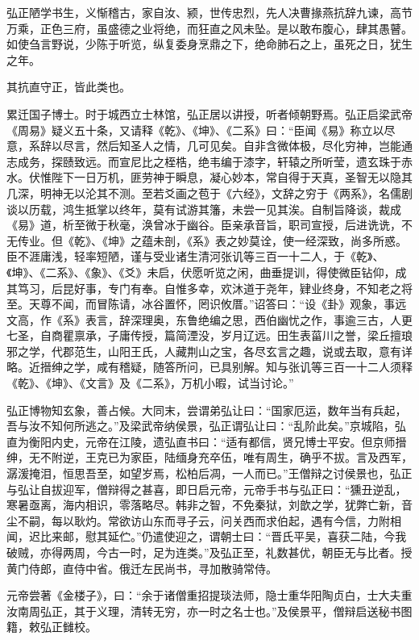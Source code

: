 \documentclass[]{article}
\begin{document}
弘正陋学书生，义惭稽古，家自汝、颍，世传忠烈，先人决曹掾燕抗辞九谏，高节万乘，正色三府，虽盛德之业将绝，而狂直之风未坠。是以敢布腹心，肆其愚瞽。如使刍言野说，少陈于听览，纵复委身烹鼎之下，绝命肺石之上，虽死之日，犹生之年。

其抗直守正，皆此类也。

累迁国子博士。时于城西立士林馆，弘正居以讲授，听者倾朝野焉。弘正启梁武帝《周易》疑义五十条，又请释《乾》、《坤》、《二系》曰：``臣闻《易》称立以尽意，系辞以尽言，然后知圣人之情，几可见矣。自非含微体极，尽化穷神，岂能通志成务，探赜致远。而宣尼比之桎梏，绝韦编于漆字，轩辕之所听莹，遗玄珠于赤水。伏惟陛下一日万机，匪劳神于瞬息，凝心妙本，常自得于天真，圣智无以隐其几深，明神无以沦其不测。至若爻画之苞于《六经》，文辞之穷于《两系》，名儒剧谈以历载，鸿生抵掌以终年，莫有试游其籓，未尝一见其涘。自制旨降谈，裁成《易》道，析至微于秋毫，涣曾冰于幽谷。臣亲承音旨，职司宣授，后进诜诜，不无传业。但《乾》、《坤》之蕴未剖，《系》表之妙莫诠，使一经深致，尚多所惑。臣不涯庸浅，轻率短陋，谨与受业诸生清河张讥等三百一十二人，于《乾》、《坤》、《二系》、《象》、《爻》未启，伏愿听览之闲，曲垂提训，得使微臣钻仰，成其笃习，后昆好事，专门有奉。自惟多幸，欢沐道于尧年，肄业终身，不知老之将至。天尊不闻，而冒陈请，冰谷置怀，罔识攸厝。''诏答曰：``设《卦》观象，事远文高，作《系》表言，辞深理奥，东鲁绝编之思，西伯幽忧之作，事逾三古，人更七圣，自商瞿禀承，子庸传授，篇简湮没，岁月辽远。田生表菑川之誉，梁丘擅琅邪之学，代郡范生，山阳王氏，人藏荆山之宝，各尽玄言之趣，说或去取，意有详略。近搢绅之学，咸有稽疑，随答所问，已具别解。知与张讥等三百一十二人须释《乾》、《坤》、《文言》及《二系》，万机小暇，试当讨论。''

弘正博物知玄象，善占候。大同末，尝谓弟弘让曰：``国家厄运，数年当有兵起，吾与汝不知何所逃之。''及梁武帝纳侯景，弘正谓弘让曰：``乱阶此矣。''京城陷，弘直为衡阳内史，元帝在江陵，遗弘直书曰：``适有都信，贤兄博士平安。但京师搢绅，无不附逆，王克已为家臣，陆缅身充卒伍，唯有周生，确乎不拔。言及西军，潺湲掩泪，恒思吾至，如望岁焉，松柏后凋，一人而已。''王僧辩之讨侯景也，弘正与弘让自拔迎军，僧辩得之甚喜，即日启元帝，元帝手书与弘正曰：``獯丑逆乱，寒暑亟离，海内相识，零落略尽。韩非之智，不免秦狱，刘歆之学，犹弊亡新，音尘不嗣，每以耿灼。常欲访山东而寻子云，问关西而求伯起，遇有今信，力附相闻，迟比来邮，慰其延伫。''仍遣使迎之，谓朝士曰：``晋氏平吴，喜获二陆，今我破贼，亦得两周，今古一时，足为连类。''及弘正至，礼数甚优，朝臣无与比者。授黄门侍郎，直侍中省。俄迁左民尚书，寻加散骑常侍。

元帝尝著《金楼子》，曰：``余于诸僧重招提琰法师，隐士重华阳陶贞白，士大夫重汝南周弘正，其于义理，清转无穷，亦一时之名士也。''及侯景平，僧辩启送秘书图籍，敕弘正雠校。
\end{document}
